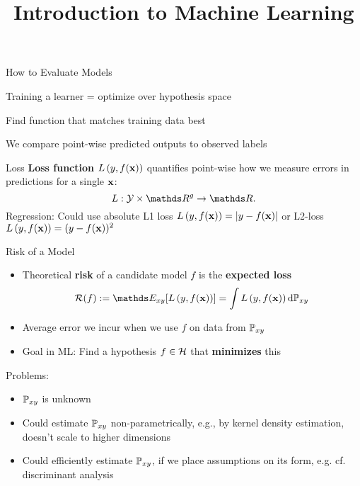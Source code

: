 \documentclass[11pt,compress,t,notes=noshow, xcolor=table]{beamer}
\title{Introduction to Machine Learning}
\begin{document}


\begin{framei}{How to Evaluate Models}
\item Training a learner = optimize over hypothesis space
\item Find function that matches training data best
\item We compare point-wise predicted outputs to 
observed labels
\vfill
{} %
\end{framei}


\begin{frame2}{Loss}
\textbf{Loss function} $L\left(y, f(\mathbf{x})\right)$ quantifies point-wise how we measure errors in predictions for a single $\mathbf{x}$:
$$
L: \Yspace \times \R^g \to \R.
$$
Regression: Could use absolute L1 loss  $L\left(y, f(\mathbf{x})\right) = |y-f(\mathbf{x})|$
or L2-loss $L\left(y, f(\mathbf{x})\right) = (y - f(\mathbf{x}))^2$
\end{frame2}


\begin{frame2}{Risk of a Model}
\begin{itemize}
  \item Theoretical \textbf{risk} of a candidate model $f$ is the \textbf{expected loss}
  $$ \riskf := \E_{xy} [\Lxy] = \int \Lxy \text{d}\Pxy $$
  \item Average error we incur when we use $f$ on data from $\mathbb{P}_{xy}$
  \item Goal in ML: Find a hypothesis $f \in \mathcal{H}$ that \textbf{minimizes} this
\end{itemize}
\vfill
Problems:
\begin{itemize}
\item $\mathbb{P}_{xy}$ is unknown
\item Could estimate $\mathbb{P}_{xy}$ non-parametrically, e.g., by kernel density estimation,  doesn't scale to higher dimensions
\item Could efficiently estimate $\mathbb{P}_{xy}$, if we place assumptions on its form, e.g. cf. discriminant analysis
\end{itemize}
\end{frame2}
\end{document}
